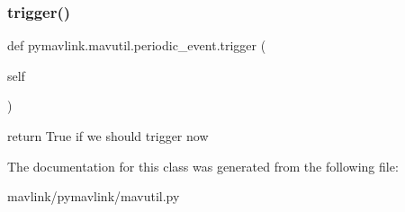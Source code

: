 \subsubsection{\texorpdfstring{trigger()}{trigger()}}
{\footnotesize\ttfamily def pymavlink.\+mavutil.\+periodic\+\_\+event.\+trigger (\begin{DoxyParamCaption}\item[{}]{self }\end{DoxyParamCaption})}

\begin{DoxyVerb}return True if we should trigger now\end{DoxyVerb}
 

The documentation for this class was generated from the following file\+:\begin{DoxyCompactItemize}
\item 
mavlink/pymavlink/mavutil.\+py\end{DoxyCompactItemize}
